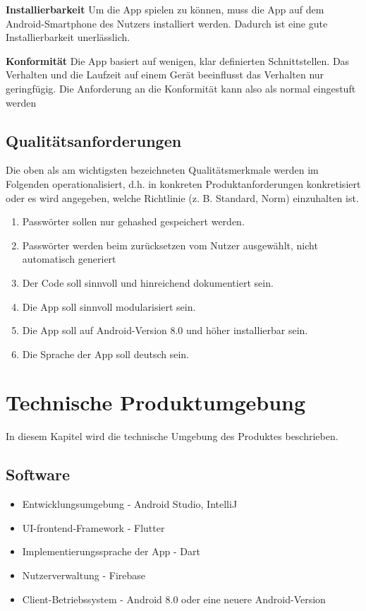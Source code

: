 \documentclass[parskip=full]{scrartcl}
\begin{document}
\textbf{Installierbarkeit}\newline
Um die App spielen zu können, muss die App auf dem Android-Smartphone des Nutzers installiert werden.
Dadurch ist eine gute Installierbarkeit unerlässlich.

\textbf{Konformität}\newline
Die App basiert auf wenigen, klar definierten Schnittstellen. Das Verhalten und die Laufzeit auf einem Gerät beeinflusst das Verhalten nur geringfügig. Die Anforderung an die Konformität kann also als normal eingestuft werden

\subsection{Qualitätsanforderungen}
Die oben als am wichtigsten bezeichneten Qualitätsmerkmale werden im Folgenden operationalisiert, d.h. in konkreten Produktanforderungen konkretisiert oder es wird angegeben, welche Richtlinie (z. B. Standard, Norm) einzuhalten ist.

\begin{enumerate}[start=1,label={$\langle$\bfseries Q\arabic*$\rangle$}, leftmargin = 5em, itemsep=4pt, parsep=4pt]
    \item Passwörter sollen nur gehashed gespeichert werden.
    \item Passwörter werden beim zurücksetzen vom Nutzer ausgewählt, nicht automatisch generiert
    \item Der Code soll sinnvoll und hinreichend dokumentiert sein.
    \item Die App soll sinnvoll modularisiert sein.
    \item Die App soll auf Android-Version 8.0 und höher installierbar sein.
    \item Die Sprache der App soll deutsch sein.
\end{enumerate}

\section{Technische Produktumgebung}
In diesem Kapitel wird die technische Umgebung des Produktes beschrieben.

\subsection{Software}
\begin{itemize}
    \item Entwicklungsumgebung - Android Studio, IntelliJ
    \item UI-frontend-Framework - Flutter
    \item Implementierungssprache der App - Dart
    \item Nutzerverwaltung - Firebase
    \item Client-Betriebssystem - Android 8.0 oder eine neuere Android-Version
\end{itemize}
\end{document}
